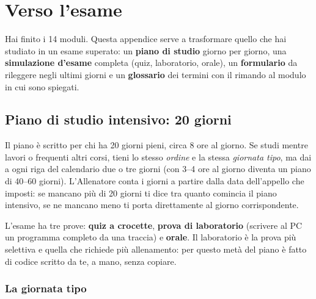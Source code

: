 \chapter{Verso l'esame}

Hai finito i 14 moduli. Questa appendice serve a trasformare quello che hai studiato in
un esame superato: un \textbf{piano di studio} giorno per giorno, una \textbf{simulazione
d'esame} completa (quiz, laboratorio, orale), un \textbf{formulario} da rileggere negli
ultimi giorni e un \textbf{glossario} dei termini con il rimando al modulo in cui sono
spiegati.

\section{Piano di studio intensivo: 20 giorni}

\begin{consiglio}
Il piano è scritto per chi ha 20 giorni pieni, circa 8 ore al giorno. Se studi mentre
lavori o frequenti altri corsi, tieni lo stesso \emph{ordine} e la stessa
\emph{giornata tipo}, ma dai a ogni riga del calendario due o tre giorni (con 3--4 ore
al giorno diventa un piano di 40--60 giorni). L'Allenatore conta i giorni a partire
dalla data dell'appello che imposti: se mancano più di 20 giorni ti dice tra quanto
comincia il piano intensivo, se ne mancano meno ti porta direttamente al giorno
corrispondente.
\end{consiglio}

L'esame ha tre prove: \textbf{quiz a crocette}, \textbf{prova di laboratorio} (scrivere al
PC un programma completo da una traccia) e \textbf{orale}. Il laboratorio è la prova
più selettiva e quella che richiede più allenamento: per questo metà del piano è fatto di
codice scritto da te, a mano, senza copiare.

\subsection*{La giornata tipo}

